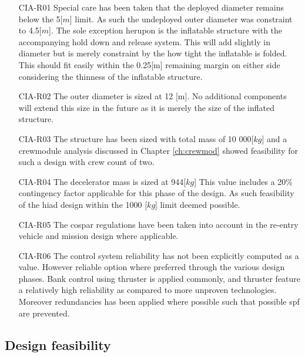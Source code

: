 \begin{itemize}
\item[CIA-R01] Special care has been taken that the deployed diameter remains below the 5[$m$] limit. As such the undeployed outer diameter was constraint to 4.5[$m$]. The sole exception herupon is the inflatable structure with the accompanying hold down and release system. This will add slightly in diameter but is merely constraint by the how tight the inflatable is folded. This should fit easily within the 0.25[m] remaining margin on either side considering the thinness of the inflatable structure. 
\item[CIA-R02] The outer diameter is sized at 12 [m]. No additional components will extend this size in the future as it is merely the size of the inflated structure.
\item[CIA-R03] The structure has been sized with total mass of 10 000[$kg$] and a crewmodule analysis discussed in Chapter \ref{ch:crewmod} showed feasibility for such a design with crew count of two.
\item[CIA-R04] The decelerator mass is sized at 944[$kg$] This value includes a 20\% contingency factor applicable for this phase of the design. As such feasibility of the \gls{hiad} design within the 1000 [$kg$] limit deemed possible.
\item[CIA-R05] The \gls{cospar} regulations have been taken into account in the re-entry vehicle and mission design where applicable.
\item[CIA-R06] The control system reliability has not been explicitly computed as a value. However reliable option where preferred through the various design phases. Bank control using thruster is applied commonly, and thruster feature a relatively high reliability as compared to more unproven technologies. Moreover redundancies has been applied where possible such that possible \gls{spf} are prevented. 
\end{itemize}


\subsection{Design feasibility}






